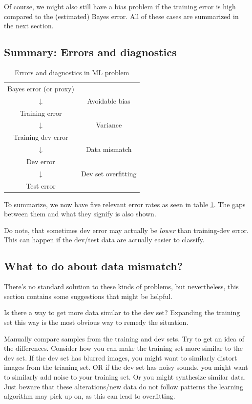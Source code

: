\documentclass[12pt, a4paper]{article}
\numberwithin{equation}{section}
\begin{document}
Of course, we might also still have a bias problem if the training error is high compared to the (estimated) Bayes error. All of these cases are summarized in the next section.

\subsection{Summary: Errors and diagnostics}

\begin{table}[b]
\centering
\label{table:diagnostic}
\begin{tabular}{cc}
Bayes error (or proxy) &                           \\
$\downarrow$           & Avoidable bias            \\
Training error         &                           \\
$\downarrow$           & Variance                  \\
Training-dev error     &                           \\
$\downarrow$           & Data mismatch             \\
Dev error              &                           \\
$\downarrow$           & Dev set overfitting       \\
Test error             &                          
\end{tabular}
\caption{Errors and diagnostics in ML problem}
\end{table}

To summarize, we now have five relevant error rates as seen in table \ref{table:diagnostic}. The gaps between them and what they signify is also shown.

Do note, that sometimes dev error may actually be \emph{lower} than training-dev error. This can happen if the dev/test data are actually easier to classify.

\subsection{What to do about data mismatch?}
There's no standard solution to these kinds of problems, but nevertheless, this section contains some suggestions that might be helpful.

Is there a way to get more data similar to the dev set? Expanding the training set this way is the most obvious way to remedy the situation.

Manually compare samples from the training and dev sets. Try to get an idea of the differences. Consider how you can make the training set more similar to the dev set. If the dev set has blurred images, you might want to similarly distort images from the trianing set. OR if the dev set has noisy sounds, you might want to similarly add noise to your training set. Or you might synthesize similar data. Just beware that these alterations/new data do not follow patterns the learning algorithm may pick up on, as this can lead to overfitting.
\end{document}

